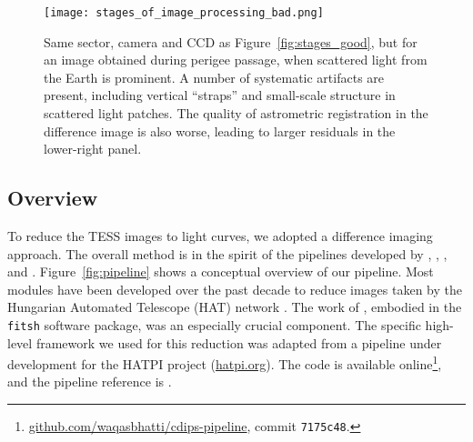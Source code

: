 \documentclass[12pt,twocolumn,tighten,trackchanges]{aastex62}
\begin{document}
\begin{figure}[!t]
    \begin{center}
        \leavevmode
        \texttt{[image: stages\_of\_image\_processing\_bad.png]}
    \end{center}
    \vspace{-0.7cm}
    \caption{
        Same sector, camera and CCD as Figure~\ref{fig:stages_good},
        but for an image obtained during perigee passage, when
        scattered light from the Earth is prominent.  A number of
        systematic artifacts are present, including vertical
        ``straps'' and small-scale structure in scattered light
        patches.  The quality of astrometric registration in the
        difference image is also worse, leading to larger residuals in
        the lower-right panel.
        \label{fig:stages_bad}
    }
\end{figure}

\subsection{Overview}

To reduce the TESS images to light curves, we adopted a difference
imaging approach.  The overall method is in the spirit of the
pipelines developed by \citet{Pal_2009},
\citet{huang_high-precision_2015}, \citet{soares-furtado_image_2017},
\citet{oelkers_precision_2018} and \citet{wallace_search_2019}.
Figure~\ref{fig:pipeline} shows a conceptual overview of our pipeline.
Most modules have been developed over the past decade to reduce images
taken by the Hungarian Automated Telescope (HAT) network
\citep{bakos_hat_review_2018}.  The work of \citet{Pal_2009}, embodied
in the \texttt{fitsh} software package, was an especially crucial
component.  The specific high-level framework we used for this
reduction was adapted from a pipeline under development for the HATPI
project (\url{hatpi.org}).  The code is available
online\footnote{\url{github.com/waqasbhatti/cdips-pipeline}, commit
\texttt{7175c48}.}, and the pipeline reference is
\citet{bhatti_cdips-pipeline_2019}.
\end{document}
